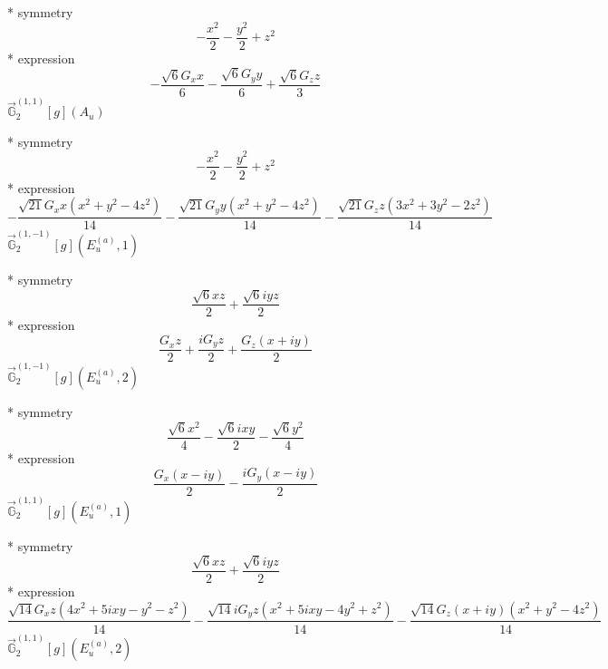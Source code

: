 \documentclass[fleqn,8pt]{jsarticle}
\begin{document}
\noindent\quad ** symmetry
\begin{dmath*}
- \frac{x^{2}}{2} - \frac{y^{2}}{2} + z^{2}
\end{dmath*}
\noindent\quad ** expression
\begin{dmath*}
- \frac{\sqrt{6} G_{x} x}{6} - \frac{\sqrt{6} G_{y} y}{6} + \frac{\sqrt{6} G_{z} z}{3}
\end{dmath*}
\noindent\quad $\vec{\mathbb{G}}_{2}^{(1,1)}[g](A_{u})$

\noindent\quad ** symmetry
\begin{dmath*}
- \frac{x^{2}}{2} - \frac{y^{2}}{2} + z^{2}
\end{dmath*}
\noindent\quad ** expression
\begin{dmath*}
- \frac{\sqrt{21} G_{x} x \left(x^{2} + y^{2} - 4 z^{2}\right)}{14} - \frac{\sqrt{21} G_{y} y \left(x^{2} + y^{2} - 4 z^{2}\right)}{14} - \frac{\sqrt{21} G_{z} z \left(3 x^{2} + 3 y^{2} - 2 z^{2}\right)}{14}
\end{dmath*}
\noindent\quad $\vec{\mathbb{G}}_{2}^{(1,-1)}[g](E_{u}^{(a)},1)$

\noindent\quad ** symmetry
\begin{dmath*}
\frac{\sqrt{6} x z}{2} + \frac{\sqrt{6} i y z}{2}
\end{dmath*}
\noindent\quad ** expression
\begin{dmath*}
\frac{G_{x} z}{2} + \frac{i G_{y} z}{2} + \frac{G_{z} \left(x + i y\right)}{2}
\end{dmath*}
\noindent\quad $\vec{\mathbb{G}}_{2}^{(1,-1)}[g](E_{u}^{(a)},2)$

\noindent\quad ** symmetry
\begin{dmath*}
\frac{\sqrt{6} x^{2}}{4} - \frac{\sqrt{6} i x y}{2} - \frac{\sqrt{6} y^{2}}{4}
\end{dmath*}
\noindent\quad ** expression
\begin{dmath*}
\frac{G_{x} \left(x - i y\right)}{2} - \frac{i G_{y} \left(x - i y\right)}{2}
\end{dmath*}
\noindent\quad $\vec{\mathbb{G}}_{2}^{(1,1)}[g](E_{u}^{(a)},1)$

\noindent\quad ** symmetry
\begin{dmath*}
\frac{\sqrt{6} x z}{2} + \frac{\sqrt{6} i y z}{2}
\end{dmath*}
\noindent\quad ** expression
\begin{dmath*}
\frac{\sqrt{14} G_{x} z \left(4 x^{2} + 5 i x y - y^{2} - z^{2}\right)}{14} - \frac{\sqrt{14} i G_{y} z \left(x^{2} + 5 i x y - 4 y^{2} + z^{2}\right)}{14} - \frac{\sqrt{14} G_{z} \left(x + i y\right) \left(x^{2} + y^{2} - 4 z^{2}\right)}{14}
\end{dmath*}
\noindent\quad $\vec{\mathbb{G}}_{2}^{(1,1)}[g](E_{u}^{(a)},2)$
\end{document}
